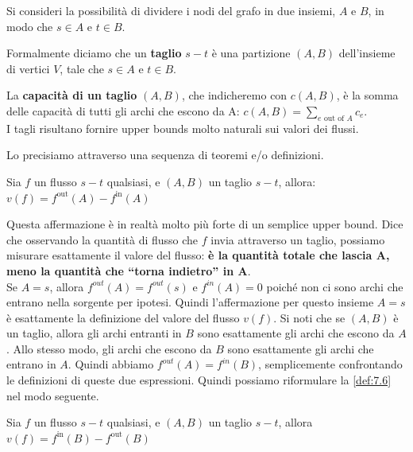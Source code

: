 \begin{myblockquote}
  Si consideri la possibilità di dividere i nodi del grafo
  in due insiemi, $A$ e $B$, in modo che $s \in A$ e $t \in B$.

  Formalmente diciamo che un \textbf{taglio} $s-t$ è una
  partizione $(A, B)$ dell'insieme di vertici $V$, tale che
  $s \in A$ e $t \in B$.

  La \textbf{capacità di un taglio} $(A, B)$, che indicheremo con $c(A , B)$, è la somma delle
  capacità di tutti gli archi che escono da A:
  $
    c(A, B) = \sum_{e \text{ out of } A} c_e.
  $\\
  I tagli risultano fornire upper bounds molto naturali sui valori dei flussi.
\end{myblockquote}

Lo precisiamo attraverso una sequenza di teoremi e/o definizioni.

\begin{myblockquote}
  \begin{minipage}{\textwidth}
    \begin{definition}\label{def:7.6}
      Sia $f$ un flusso $s-t$ qualsiasi, e $(A, B)$ un taglio $s-t$, allora:
      $
        v(f) = f^{\text{out}}(A) - f^{\text{in}}(A)
      $
    \end{definition}
  \end{minipage}
\end{myblockquote}

Questa affermazione è in realtà molto più forte di un semplice upper
bound. Dice che osservando la quantità di flusso che $f$ invia
attraverso un taglio, possiamo misurare esattamente il valore del
flusso: \textbf{è la quantità totale che lascia A, meno la quantità che
  ``torna indietro'' in A}.\\

Se $A = {s}$, allora $f^{out}(A) = f^{out}(s)$ e $f^{in}(A) = 0$
poiché non ci sono archi che entrano nella sorgente per ipotesi. Quindi
l'affermazione per questo insieme $A = {s}$ è esattamente la
definizione del valore del flusso $v(f)$. Si noti che se $(A, B)$ è
un taglio, allora gli archi entranti in $B$ sono esattamente gli archi
che escono da $A$. Allo stesso modo, gli archi che escono da $B$
sono esattamente gli archi che entrano in $A$. Quindi abbiamo
$f^{out}(A) = f^{in}(B)$, semplicemente confrontando le definizioni di
queste due espressioni. Quindi possiamo riformulare la \ref{def:7.6} nel modo
seguente.

\begin{myblockquote}
  \begin{minipage}{\textwidth}
    \begin{definition}\label{def:7.7}
      Sia $f$ un flusso $s-t$ qualsiasi, e $(A, B)$ un taglio $s-t$, allora
      $
        v(f) = f^{\text{in}}(B) - f^{\text{out}}(B)
      $
    \end{definition}
  \end{minipage}
\end{myblockquote}

